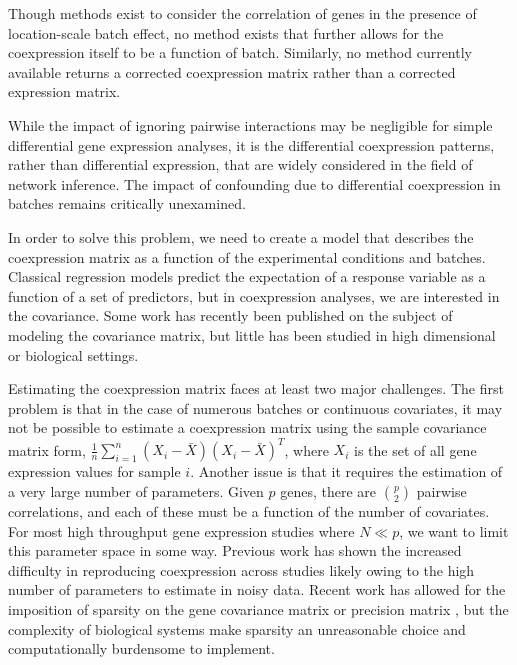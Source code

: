 Though methods exist to consider the correlation of genes in the presence
of location-scale batch effect, no method exists that further allows
for the coexpression itself to be a function of batch. Similarly,
no method currently available returns a corrected coexpression matrix
rather than a corrected expression matrix.

While the impact of ignoring pairwise interactions may be negligible
for simple differential gene expression analyses, it is the differential coexpression patterns, rather than differential expression, that
are widely considered in the field of network inference\cite{de2010differential,chen2011removing,fukushima2013diffcorr}.
The impact of confounding due to differential coexpression in batches
remains critically unexamined.

In order to solve this problem, we need to create a model that describes
the coexpression matrix as a function of the experimental conditions
and batches. Classical regression models predict the expectation of
a response variable as a function of a set of predictors, but in coexpression analyses, we are interested
in the covariance. Some work has recently been published on the subject of modeling the covariance matrix\cite{hoff2012covariance,zou2016covariance},
but little has been studied in high dimensional or biological settings. 

Estimating the coexpression matrix faces at least two major challenges. The first problem
is that in the case of numerous batches or
continuous covariates, it may not be possible to estimate a coexpression
matrix using the sample covariance matrix form, $\frac{1}{n}\sum_{i=1}^{n}\left(X_{i}-\bar{X}\right)\left(X_{i}-\bar{X}\right)^{T}$,
where $X_{i}$ is the set of all gene expression values for sample
$i$. Another issue is that it requires the estimation of a very large number of parameters.
Given $p$ genes, there are $\binom{p}{2}$ pairwise correlations,
and each of these must be a function of the number of covariates.
For most high throughput gene expression studies where $N\ll p$,
we want to limit this parameter space in some way. Previous work has
shown the increased difficulty in reproducing coexpression across
studies\cite{schlauch2016estimating} likely owing to the high number
of parameters to estimate in noisy data. Recent work has allowed for
the imposition of sparsity on the gene covariance matrix \cite{bien2011sparse}
or precision matrix \cite{friedman2008sparse}, but the complexity
of biological systems make sparsity an unreasonable choice and computationally
burdensome to implement. 

